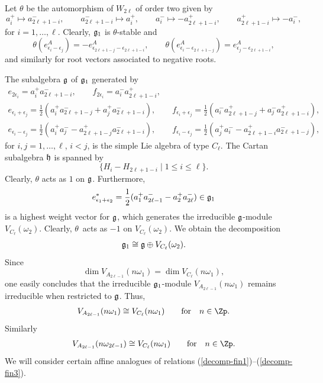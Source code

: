 Let $\theta$ be the automorphism of $W_{2 \ell}$ of order two given
by
%
\[  a_{i} ^+ \mapsto  a_{2\ell+1-i} ^{-}, \qquad a_{2\ell+1-i} ^-
\mapsto  a_{i} ^{+}, \qquad a_{i} ^-  \mapsto - a_{2\ell+1-i} ^+,
\qquad a_{2\ell+1-i} ^+ \mapsto - a_{i} ^-,\]
for $i =1, \dots, \ell$. Clearly, $\frak g _1$ is $\theta$-stable
and \[
\theta (e_{\epsilon_i-\epsilon_j}^A)=- e_{\epsilon_{2\ell
+1-j}-\epsilon_{2\ell +1-i}}^A, \qquad \theta
(e_{\epsilon_i-\epsilon_{2\ell +1-j}}^A)=
e_{\epsilon_{j}-\epsilon_{2\ell +1-i}}^A,
\]
%
and similarly for root vectors associated to negative roots.


The subalgebra $\frak g$ of $\frak g _1$ generated by
\begin{gather*}
  e_{2 \epsilon _{i}} =a_i ^+  a_{2\ell +1-i} ^-, \qquad
    f_{2 \epsilon _{i}}=a_i ^-  a_{2\ell +1-i} ^+,
  \\
  e_{\epsilon _{i}+ \epsilon _{j}}=\frac{1}{2}(a_i ^+
 a_{2\ell +1-j} ^- + a_j ^+  a_{2\ell +1-i} ^-), \qquad
 f_{\epsilon _{i}+ \epsilon _{j}}=\frac{1}{2}(a_i ^- a_{2\ell +1-j}
^+ + a_j ^-  a_{2\ell +1-i} ^+),   \\
  e_{\epsilon _{i}- \epsilon _{j}}=\frac{1}{2}(a_i ^+
 a_{j} ^- - a_{2\ell +1-j} ^+
 a_{2\ell +1-i} ^-), \qquad
f_{\epsilon _{i}- \epsilon _{j}}=\frac{1}{2}(a_j ^+
 a_{i} ^- - a_{2\ell +1-i} ^+
 a_{2\ell +1-j} ^-),
\end{gather*}
for $i,j =1, \dots, \ell$, $i<j$, is the simple Lie algebra of type
$C_{\ell}$. The Cartan subalgebra $\frak h$ is spanned by
\[
\{ H_i - H_{2\ell +1-i}  \; \vert \; 1 \le i \le  \ell \}.
\]
Clearly, $\theta$ acts as $1$ on $\frak g$. Furthermore, \[
e_{\epsilon _{1}+ \epsilon _{2}} ^*=\frac{1}{2}(a_1 ^+
 a_{2\ell -1} ^- - a_2 ^+  a_{2\ell} ^-) \in \frak g _1
\]
is a highest weight vector for $\frak g$, which generates the
irreducible $\frak g$-module $V_{C_{\ell}}(\omega _2)$. Clearly,
$\theta$~acts as $-1$ on $V_{C_{\ell}}(\omega _2)$. We obtain the
decomposition
\begin{gather} \label{decomp-fin1}
 \frak g _1 \cong \frak g \oplus V_{C_{\ell}}(\omega _2).
  \end{gather}
Since
%
\[ \dim V_{A_{2\ell -1}} (n \omega_1) = \dim V_{C_{\ell }} (n
\omega_1),\] one easily concludes that the irreducible $\frak g
_1$-module $V_{A_{2\ell -1}} (n \omega_1)$ remains irreducible when
restricted to $\frak g$. Thus,
\begin{gather} \label{decomp-fin2} V_{A_{2\ell -1} } (n \omega_1) \cong V_{C_{
\ell  } } (n \omega_1) \qquad \mbox{for} \quad n \in \Zp.
\end{gather}
Similarly
\begin{gather} \label{decomp-fin3} V_{A_{2\ell -1} } (n \omega_{2 \ell -1})
\cong V_{C_{ \ell  } } (n \omega_1) \qquad \mbox{for} \quad n \in \Zp.
\end{gather}
We will consider certain af\/f\/ine analogues of relations
(\ref{decomp-fin1})--(\ref{decomp-fin3}).

